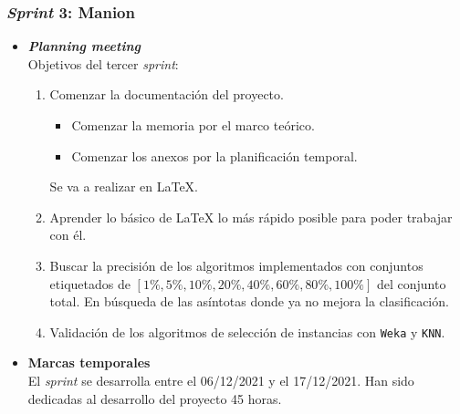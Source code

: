 \subsubsection{\textit{Sprint} 3: Manion}
\begin{itemize}
\item \textbf{\textit{Planning meeting}}\\
Objetivos del tercer \textit{sprint}:
\begin{enumerate}
\item Comenzar la documentación del proyecto.
\begin{itemize}
\item Comenzar la memoria por el marco teórico.
\item Comenzar los anexos por la planificación temporal.
\end{itemize} 
Se va a realizar en \LaTeX.
\item Aprender lo básico de \LaTeX{} lo más rápido posible para poder trabajar con él.
\item Buscar la precisión de los algoritmos implementados con conjuntos etiquetados de $[1\%, 5\%, 10\%, 20\%, 40\%, 60\%, 80\%, 100\%]$ del conjunto total. En búsqueda de las asíntotas donde ya no mejora la clasificación.
\item Validación de los algoritmos de selección de instancias con \texttt{Weka} y \texttt{KNN}.
\end{enumerate}

\item \textbf{Marcas temporales}\\
El \textit{sprint} se desarrolla entre el 06/12/2021 y el 17/12/2021. Han sido dedicadas al desarrollo del proyecto 45 horas.


\end{itemize}
